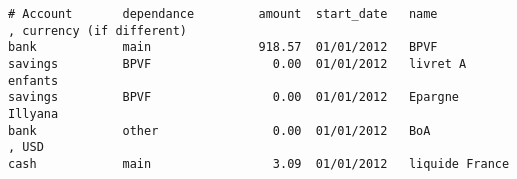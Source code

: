 \linenumbers
\footnotesize
\begin{verbatim}
# Account       dependance         amount  start_date   name            , currency (if different)
bank            main               918.57  01/01/2012   BPVF
savings         BPVF                 0.00  01/01/2012   livret A enfants
savings         BPVF                 0.00  01/01/2012   Epargne Illyana
bank            other                0.00  01/01/2012   BoA             , USD
cash            main                 3.09  01/01/2012   liquide France
\end{verbatim}
\nolinenumbers
\normalsize
